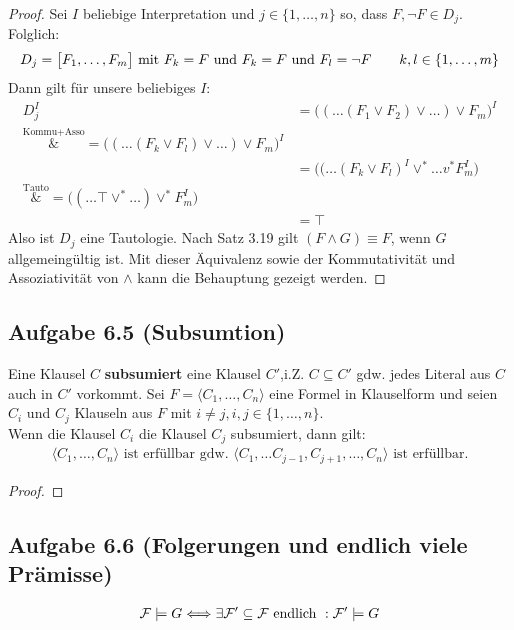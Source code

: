 \begin{proof}
	Sei $I$ beliebige Interpretation und $j\in\lbrace1,\ldots,n\rbrace$ so, dass $F,\neg F\in D_j$. 		
	Folglich:
	\begin{align*}
		D_j=\big[F_1,\ldots,F_m\big]\mit F_k=F\text{ und }F_k=F\text{ und }F_l=\neg F\qquad k,l\in\lbrace1,\ldots,m\rbrace
	\end{align*}
	Dann gilt für unsere beliebiges $I$:
	\begin{align*}
		D_j^I&=\big((\ldots(F_1\vee F_2)\vee\ldots)\vee F_m\big)^I\\
		\overset{\text{Kommu+Asso}}&=
		\big((\ldots(F_k\vee F_l)\vee\ldots)\vee F_m\big)^I\\
		&=\big((\ldots(F_k\vee F_l)^I\vee^\ast\ldots v^\ast F_m^I\big)\\
		\overset{\text{Tauto}}&=
		\big((\ldots\top \vee^\ast\ldots)\vee^\ast F_m^I\big)\\
		&=\top
	\end{align*}
	Also ist $D_j$ eine Tautologie. 
	Nach Satz 3.19 gilt $(F\wedge G)\equiv F$, wenn $G$ allgemeingültig ist. 
	Mit dieser Äquivalenz sowie der Kommutativität und Assoziativität von $\wedge$ kann die Behauptung gezeigt werden.
\end{proof}

\subsection{Aufgabe 6.5 (Subsumtion)}
Eine Klausel $C$ \textbf{subsumiert} eine Klausel $C'$,i.Z. $C\subseteq C'$ gdw. jedes Literal aus $C$ auch in $C'$ vorkommt.\nl
Sei $F=\langle C_1,\ldots,C_n\rangle$ eine Formel in Klauselform und seien $C_i$ und  $C_j$ Klauseln aus $F$ mit $i\neq j,i,j\in\lbrace1,\ldots,n\rbrace$.\\
Wenn die Klausel $C_i$ die Klausel $C_j$ subsumiert, dann gilt:
\begin{align*}
	\big\langle C_1,\ldots,C_n\big\rangle\text{ ist erfüllbar gdw. }\big\langle C_1,\ldots C_{j-1},C_{j+1},\ldots,C_n\big\rangle\text{ ist erfüllbar.}
\end{align*}

\begin{proof}
\end{proof}

\subsection{Aufgabe 6.6 (Folgerungen und endlich viele Prämisse)}
\begin{align*}
	\F\models G\Longleftrightarrow \exists\F'\subseteq\F\text{ endlich }:\F'\models G
\end{align*}


